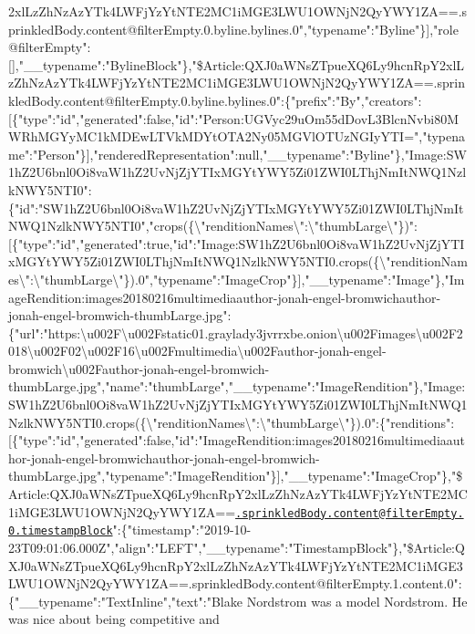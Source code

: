 2xlLzZhNzAzYTk4LWFjYzYtNTE2MC1iMGE3LWU1OWNjN2QyYWY1ZA==.sprinkledBody.content@filterEmpty.0.byline.bylines.0","typename":"Byline"\}{]},"role@filterEmpty":{[}{]},"\_\_typename":"BylineBlock"\},"\$Article:QXJ0aWNsZTpueXQ6Ly9hcnRpY2xlLzZhNzAzYTk4LWFjYzYtNTE2MC1iMGE3LWU1OWNjN2QyYWY1ZA==.sprinkledBody.content@filterEmpty.0.byline.bylines.0":\{"prefix":"By","creators":{[}\{"type":"id","generated":false,"id":"Person:UGVyc29uOm55dDovL3BlcnNvbi80MWRhMGYyMC1kMDEwLTVkMDYtOTA2Ny05MGVlOTUzNGIyYTI=","typename":"Person"\}{]},"renderedRepresentation":null,"\_\_typename":"Byline"\},"Image:SW1hZ2U6bnl0Oi8vaW1hZ2UvNjZjYTIxMGYtYWY5Zi01ZWI0LThjNmItNWQ1NzlkNWY5NTI0":\{"id":"SW1hZ2U6bnl0Oi8vaW1hZ2UvNjZjYTIxMGYtYWY5Zi01ZWI0LThjNmItNWQ1NzlkNWY5NTI0","crops(\{\textbackslash{}"renditionNames\textbackslash{}":\textbackslash{}"thumbLarge\textbackslash{}"\})":{[}\{"type":"id","generated":true,"id":"Image:SW1hZ2U6bnl0Oi8vaW1hZ2UvNjZjYTIxMGYtYWY5Zi01ZWI0LThjNmItNWQ1NzlkNWY5NTI0.crops(\{\textbackslash{}"renditionNames\textbackslash{}":\textbackslash{}"thumbLarge\textbackslash{}"\}).0","typename":"ImageCrop"\}{]},"\_\_typename":"Image"\},"ImageRendition:images20180216multimediaauthor-jonah-engel-bromwichauthor-jonah-engel-bromwich-thumbLarge.jpg":\{"url":"https:\textbackslash{}u002F\textbackslash{}u002Fstatic01.graylady3jvrrxbe.onion\textbackslash{}u002Fimages\textbackslash{}u002F2018\textbackslash{}u002F02\textbackslash{}u002F16\textbackslash{}u002Fmultimedia\textbackslash{}u002Fauthor-jonah-engel-bromwich\textbackslash{}u002Fauthor-jonah-engel-bromwich-thumbLarge.jpg","name":"thumbLarge","\_\_typename":"ImageRendition"\},"Image:SW1hZ2U6bnl0Oi8vaW1hZ2UvNjZjYTIxMGYtYWY5Zi01ZWI0LThjNmItNWQ1NzlkNWY5NTI0.crops(\{\textbackslash{}"renditionNames\textbackslash{}":\textbackslash{}"thumbLarge\textbackslash{}"\}).0":\{"renditions":{[}\{"type":"id","generated":false,"id":"ImageRendition:images20180216multimediaauthor-jonah-engel-bromwichauthor-jonah-engel-bromwich-thumbLarge.jpg","typename":"ImageRendition"\}{]},"\_\_typename":"ImageCrop"\},"\$Article:QXJ0aWNsZTpueXQ6Ly9hcnRpY2xlLzZhNzAzYTk4LWFjYzYtNTE2MC1iMGE3LWU1OWNjN2QyYWY1ZA==\href{mailto:.sprinkledBody.content@filterEmpty.0.timestampBlock}{\nolinkurl{.sprinkledBody.content@filterEmpty.0.timestampBlock}}":\{"timestamp":"2019-10-23T09:01:06.000Z","align":"LEFT","\_\_typename":"TimestampBlock"\},"\$Article:QXJ0aWNsZTpueXQ6Ly9hcnRpY2xlLzZhNzAzYTk4LWFjYzYtNTE2MC1iMGE3LWU1OWNjN2QyYWY1ZA==.sprinkledBody.content@filterEmpty.1.content.0":\{"\_\_typename":"TextInline","text":"Blake
Nordstrom was a model Nordstrom. He was nice about being competitive and
